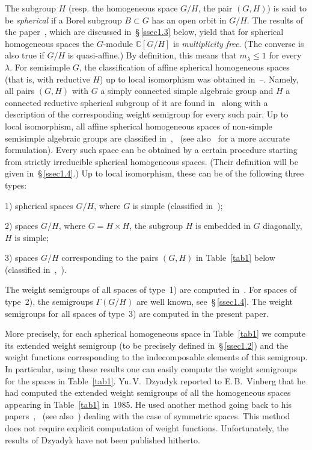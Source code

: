 \documentclass[12pt]{amsart}
\theoremstyle{definition}
\theoremstyle{remark}
\begin{document}
The subgroup $H$ (resp. the homogeneous space $G/H$, the pair
$(G,H)$) is said to be \textit{spherical} if a Borel subgroup
$B\subset G$ has an open orbit in $G/H$. The results of the
paper~\cite{1}, which are discussed in~\S\,\ref{ssec1.3} below,
yield that for spherical homogeneous spaces the $G$-module $\mathbb
C[G/H]$ is \emph{multiplicity free}. (The converse is also true if
$G/H$ is quasi-affine.) By definition, this means that $m_\lambda
{\leqslant} 1$ for every $\lambda$. For semisimple $G$, the classification
of affine spherical homogeneous spaces (that is, with reductive $H$)
up to local isomorphism was obtained in~\cite{2}--\cite{4}. Namely,
all pairs $(G,H)$ with $G$ a simply connected simple algebraic group
and $H$ a connected reductive spherical subgroup of it are found
in~\cite{2} along with a description of the corresponding weight
semigroup for every such pair. Up to local isomorphism, all affine
spherical homogeneous spaces of non-simple semisimple algebraic
groups are classified in~\cite{3},~\cite{4} (see also~\cite{5} for a
more accurate formulation). Every such space can be obtained by a
certain procedure starting from strictly irreducible spherical
homogeneous spaces. (Their definition will be given
in~\S\,\ref{ssec1.4}.) Up to local isomorphism, these can be of the
following three types:

1) spherical spaces $G/H$, where $G$ is simple (classified
in~\cite{2});

2) spaces $G/H$, where $G = H\times H$, the subgroup $H$ is embedded
in $G$ diagonally, $H$ is simple;

3) spaces $G/H$ corresponding to the pairs $(G,H)$ in
Table~\ref{tab1} below (classified in~\cite{3},~\cite{4}).

The weight semigroups of all spaces of type~1) are computed
in~\cite{2}. For spaces of type~2), the semigroups $\Gamma(G/H)$ are
well known, see~\S\,\ref{ssec1.4}. The weight semigroups for all
spaces of type~3) are computed in the present paper.

More precisely, for each spherical homogeneous space in
Table~\ref{tab1} we compute its extended weight semigroup (to be
precisely defined in~\S\,\ref{ssec1.2}) and the weight functions
corresponding to the indecomposable elements of this semigroup. In
particular, using these results one can easily compute the weight
semigroups for the spaces in Table~\ref{tab1}. Yu.\,V.~Dzyadyk
reported to E.\,B.~Vinberg that he had computed the extended weight
semigroups of all the homogeneous spaces appearing in
Table~\ref{tab1} in~1985. He used another method going back to his
papers~\cite{6},~\cite{7} (see also~\cite{8}) dealing with the case
of symmetric spaces. This method does not require explicit
computation of weight functions. Unfortunately, the results of
Dzyadyk have not been published hitherto.
\end{document}
